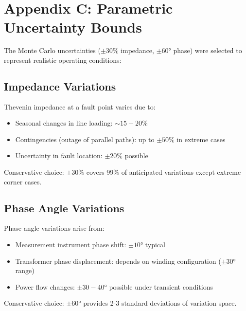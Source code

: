 
\section*{Appendix C: Parametric Uncertainty Bounds}

The Monte Carlo uncertainties ($\pm 30\%$ impedance, $\pm 60°$ phase) were selected to 
represent realistic operating conditions:

\subsection*{Impedance Variations}

Thevenin impedance at a fault point varies due to:
\begin{itemize}
    \item Seasonal changes in line loading: $\sim 15-20\%$
    \item Contingencies (outage of parallel paths): up to $\pm 50\%$ in extreme cases
    \item Uncertainty in fault location: $\pm 20\%$ possible
\end{itemize}

Conservative choice: $\pm 30\%$ covers 99\% of anticipated variations except extreme 
corner cases.

\subsection*{Phase Angle Variations}

Phase angle variations arise from:
\begin{itemize}
    \item Measurement instrument phase shift: $\pm 10°$ typical
    \item Transformer phase displacement: depends on winding configuration ($\pm 30°$ range)
    \item Power flow changes: $\pm 30-40°$ possible under transient conditions
\end{itemize}

Conservative choice: $\pm 60°$ provides 2-3 standard deviations of variation space.



